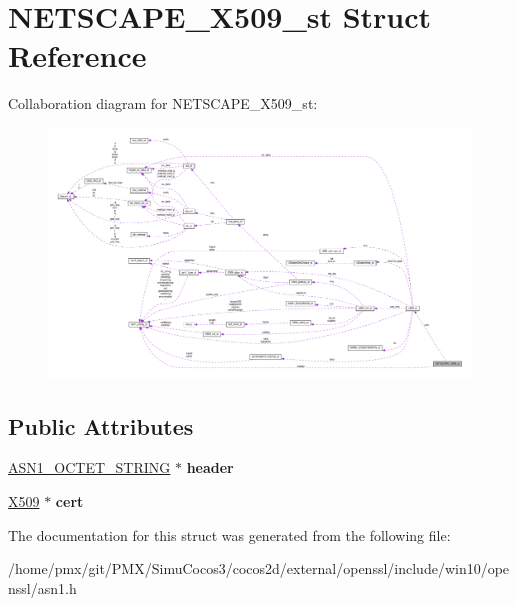 \hypertarget{structNETSCAPE__X509__st}{}\section{N\+E\+T\+S\+C\+A\+P\+E\+\_\+\+X509\+\_\+st Struct Reference}
\label{structNETSCAPE__X509__st}


Collaboration diagram for N\+E\+T\+S\+C\+A\+P\+E\+\_\+\+X509\+\_\+st\+:
\nopagebreak
\begin{figure}[H]
\begin{center}
\leavevmode
\includegraphics[width=350pt]{structNETSCAPE__X509__st__coll__graph}
\end{center}
\end{figure}
\subsection*{Public Attributes}
\begin{DoxyCompactItemize}
\item 
\mbox{\label{structNETSCAPE__X509__st_a00f5f31a882f9ee420d1a3bd2beebedd}} 
\hyperlink{structasn1__string__st}{A\+S\+N1\+\_\+\+O\+C\+T\+E\+T\+\_\+\+S\+T\+R\+I\+NG} $\ast$ {\bfseries header}
\item 
\mbox{\label{structNETSCAPE__X509__st_ae73d9f6791b788f7c724b89f715d3d76}} 
\hyperlink{structx509__st}{X509} $\ast$ {\bfseries cert}
\end{DoxyCompactItemize}


The documentation for this struct was generated from the following file\+:\begin{DoxyCompactItemize}
\item 
/home/pmx/git/\+P\+M\+X/\+Simu\+Cocos3/cocos2d/external/openssl/include/win10/openssl/asn1.\+h\end{DoxyCompactItemize}
